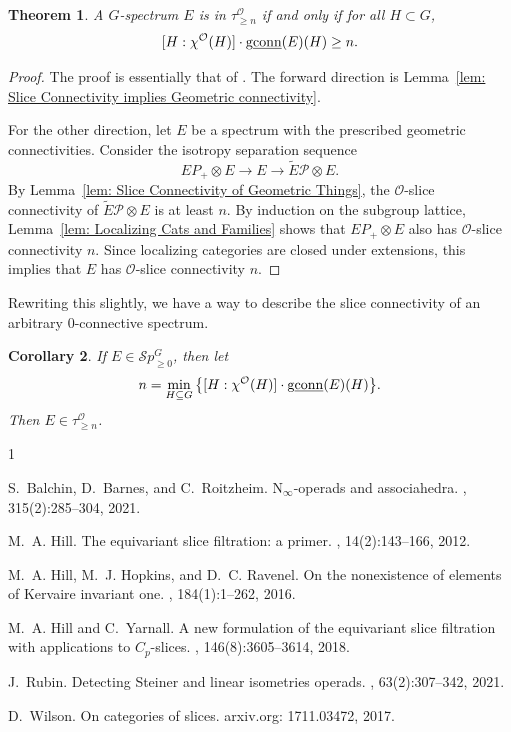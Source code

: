 \documentclass{amsart}
\newcommand{\m}[1]{{\protect\underline{#1}}}
\newcommand{\cc}[1]{\mathcal #1}
\newcommand{\cO}{\cc{O}}
\newcommand{\Sp}{\mathcal Sp}
\DeclareMathOperator{\conn}{conn}
\DeclareMathOperator{\mgconn}{g\m{\conn}}
\numberwithin{equation}{section}
\newtheorem{theorem}{Theorem}[section]
\newtheorem{corollary}[theorem]{Corollary}
\theoremstyle{remark}
\theoremstyle{definition}
\begin{document}
\begin{theorem}\label{thm: GFP Reformulation}
    A \(G\)-spectrum \(E\) is in \(\tau_{\geq n}^{\cO}\) if and only if for all \(H\subset G\),
    \[
    [H:\chi^{\cO}(H)]\cdot\mgconn(E)(H)\geq n.
    \]
\end{theorem}

\begin{proof}
    The proof is essentially that of \cite[Theorem 2.5]{HillYarnall}. The forward direction is  Lemma~\ref{lem: Slice Connectivity implies Geometric connectivity}. 
    
    For the other direction, let \(E\) be a spectrum with the prescribed geometric connectivities. Consider the isotropy separation sequence
    \[
        EP_+\otimes E\to E\to \tilde{E}\mathcal P\otimes E.
    \]
    By Lemma~\ref{lem: Slice Connectivity of Geometric Things}, the \(\cO\)-slice connectivity of \(\tilde{E}\mathcal P\otimes E\) is at least \(n\). By induction on the subgroup lattice, Lemma~\ref{lem: Localizing Cats and Families} shows that \(EP_+\otimes E\) also has \(\cO\)-slice connectivity \(n\). Since localizing categories are closed under extensions, this implies that \(E\) has \(\cO\)-slice connectivity \(n\).   
\end{proof}

Rewriting this slightly, we have a way to describe the slice connectivity of an arbitrary \(0\)-connective spectrum.

\begin{corollary}\label{cor: Determining Slice Connectivity}
    If \(E\in\Sp^{G}_{\geq 0}\), then let 
    \[
        n=\min_{H\subseteq G}\big\{[H:\chi^{\cO}(H)]\cdot\mgconn(E)(H)\big\}.
    \]
    Then \(E\in\tau_{\geq n}^{\cO}\).
\end{corollary}

\begin{thebibliography}{1}

S.~Balchin, D.~Barnes, and C.~Roitzheim.
\newblock N{$_\infty$}-operads and associahedra.
, 315(2):285--304, 2021.

M.~A. Hill.
\newblock The equivariant slice filtration: a primer.
, 14(2):143--166, 2012.

M.~A. Hill, M.~J. Hopkins, and D.~C. Ravenel.
\newblock On the nonexistence of elements of {K}ervaire invariant one.
, 184(1):1--262, 2016.

M.~A. Hill and C.~Yarnall.
\newblock A new formulation of the equivariant slice filtration with
  applications to {$C_p$}-slices.
, 146(8):3605--3614, 2018.

J.~Rubin.
\newblock Detecting {S}teiner and linear isometries operads.
, 63(2):307--342, 2021.

D.~Wilson.
\newblock On categories of slices.
\newblock arxiv.org: 1711.03472, 2017.

\end{thebibliography}
\end{document}
